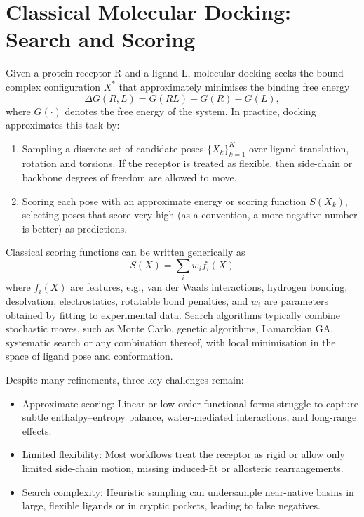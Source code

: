 \documentclass[12pt]{article}
\begin{document}
\section{Classical Molecular Docking: Search and Scoring}

Given a protein receptor R and a ligand L, molecular docking seeks the bound complex configuration $X^{\ast}$ that approximately minimises the binding free energy
\begin{equation}
\Delta G(R,L) = G(RL) - G(R) - G(L),
\label{eq:freeENE}
\end{equation}
where $G(\cdot)$ denotes the free energy of the system. In practice, docking approximates this task by:
\begin{enumerate}
  \item Sampling a discrete set of candidate poses $\{X_k\}_{k=1}^{K}$ over ligand translation, rotation and torsions. If the receptor is treated as flexible, then side-chain or backbone degrees of freedom are allowed to move.
  \item Scoring each pose with an approximate energy or scoring function $S(X_k)$, selecting poses that score very high (as a convention, a more negative number is better) as predictions.
\end{enumerate}

Classical scoring functions can be written generically as
\begin{equation}
S(X) = \sum_{i} w_i f_i(X)
\label{eq:scorefunc}
\end{equation}
where $f_i(X)$ are features, e.g., van der Waals interactions, hydrogen bonding, desolvation, electrostatics, rotatable bond penalties, and $w_i$ are parameters obtained by fitting to experimental data. Search algorithms typically combine stochastic moves, such as Monte Carlo, genetic algorithms, Lamarckian GA, systematic search or any combination thereof, with local minimisation in the space of ligand pose and conformation.

Despite many refinements, three key challenges remain:
\begin{itemize}
  \item Approximate scoring: Linear or low-order functional forms struggle to capture subtle enthalpy–entropy balance, water-mediated interactions, and long-range effects.
  \item Limited flexibility: Most workflows treat the receptor as rigid or allow only limited side-chain motion, missing induced-fit or allosteric rearrangements.
  \item Search complexity: Heuristic sampling can undersample near-native basins in large, flexible ligands or in cryptic pockets, leading to false negatives.
\end{itemize}
\end{document}
